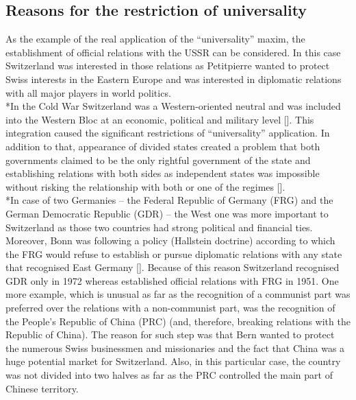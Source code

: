 \documentclass[a4paper]{article}
\begin{document}
\subsection{Reasons for the restriction of universality}
As the example of the real application of the “universality” maxim, the establishment of official relations with the USSR can be considered. In this case Switzerland was interested in those relations as Petitpierre wanted to protect Swiss interests in the Eastern Europe and was interested in diplomatic relations with all major players in world politics.
\\*In the Cold War Switzerland was a Western-oriented neutral and was included into the Western Bloc at an economic, political and military level []. This integration caused the significant restrictions of “universality” application. In addition to that, appearance of divided states created a problem that both governments claimed to be the only rightful government of the state and establishing relations with both sides as independent states was impossible without risking the relationship with both or one of the regimes [].
\\*In case of two Germanies – the Federal Republic of Germany (FRG) and the German Democratic Republic (GDR) – the West one was more important to Switzerland as those two countries had strong political and financial ties. Moreover, Bonn was following a policy (Hallstein doctrine) according to which the FRG would refuse to establish or pursue diplomatic relations with any state that recognised East Germany []. Because of this reason Switzerland recognised GDR only in 1972 whereas established official relations with FRG in 1951. One more example, which is unusual as far as the recognition of a communist part was preferred over the relations with a non-communist part, was the recognition of the People’s Republic of China (PRC) (and, therefore, breaking relations with the Republic of China). The reason for such step was that Bern wanted to protect the numerous Swiss businessmen and missionaries and the fact that China was a huge potential market for Switzerland. Also, in this particular case, the country was not divided into two halves as far as the PRC controlled the main part of Chinese territory.
\end{document}
